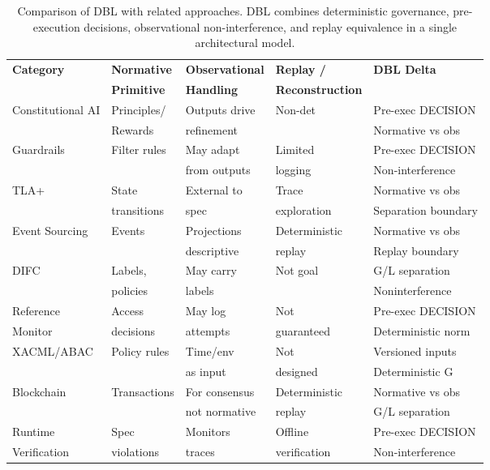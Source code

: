 \begin{table}[h]
\centering
\small
\begin{tabular}{|l|l|l|l|l|}
\hline
\textbf{Category} & \textbf{Normative} & \textbf{Observational} & \textbf{Replay /} & \textbf{DBL Delta} \\
\textbf{} & \textbf{Primitive} & \textbf{Handling} & \textbf{Reconstruction} & \textbf{} \\
\hline
Constitutional AI & Principles/ & Outputs drive & Non-det & Pre-exec DECISION \\
& Rewards & refinement & & Normative vs obs \\
\hline
Guardrails & Filter rules & May adapt & Limited & Pre-exec DECISION \\
& & from outputs & logging & Non-interference \\
\hline
TLA+ & State & External to & Trace & Normative vs obs \\
& transitions & spec & exploration & Separation boundary \\
\hline
Event Sourcing & Events & Projections & Deterministic & Normative vs obs \\
& & descriptive & replay & Replay boundary \\
\hline
DIFC & Labels, & May carry & Not goal & G/L separation \\
& policies & labels & & Noninterference \\
\hline
Reference & Access & May log & Not & Pre-exec DECISION \\
Monitor & decisions & attempts & guaranteed & Deterministic norm \\
\hline
XACML/ABAC & Policy rules & Time/env & Not & Versioned inputs \\
& & as input & designed & Deterministic G \\
\hline
Blockchain & Transactions & For consensus & Deterministic & Normative vs obs \\
& & not normative & replay & G/L separation \\
\hline
Runtime & Spec & Monitors & Offline & Pre-exec DECISION \\
Verification & violations & traces & verification & Non-interference \\
\hline
\end{tabular}
\caption{Comparison of DBL with related approaches. DBL combines deterministic governance, pre-execution decisions, observational non-interference, and replay equivalence in a single architectural model.}
\label{tab:related-work}
\end{table}

